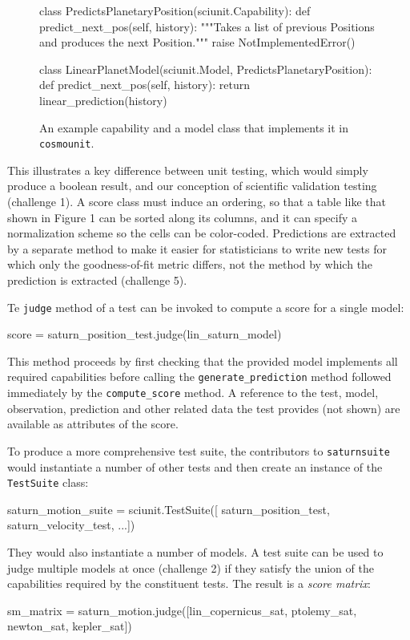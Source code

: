 \documentclass[9pt]{sig-alternate}
\newcommand{\verbx}[1]{\lstinline{#1}}
\begin{document}
\begin{figure}
\small
\begin{python}
class PredictsPlanetaryPosition(sciunit.Capability):
  def predict_next_pos(self, history): 
    """Takes a list of previous Positions and produces the next Position."""
    raise NotImplementedError()

class LinearPlanetModel(sciunit.Model, 
    PredictsPlanetaryPosition):
  def predict_next_pos(self, history):
    return linear_prediction(history)
\end{python}
\vspace{-12px}
\caption{\small An example capability and a model class that implements it in \verbx{cosmounit}.}
\label{fig:capability}
\vspace{-10px}
\end{figure}

This illustrates a key difference between unit testing, which would simply produce a boolean result, and our conception of scientific validation testing (challenge 1). A score class must induce an ordering, so that a table like that shown in Figure 1 can be sorted along its columns, and it can  specify a normalization scheme so the cells can be color-coded. Predictions are extracted by a separate method to make it easier for statisticians to write new tests for which only the goodness-of-fit metric differs, not the method by which the prediction is extracted (challenge 5). %

Te \verbx{judge} method of a test can be invoked to compute a score for a single model: 
\vspace{-4px}
\begin{python}
score = saturn_position_test.judge(lin_saturn_model)
\end{python}
\vspace{-5px}
This method proceeds by first checking that the provided model implements all required capabilities before calling the \verbx{generate_prediction} method followed immediately by the \verbx{compute_score} method. A reference to the test,   model, observation, prediction and other related data the test provides (not shown) are available as attributes of the score.

To produce a more comprehensive test suite, the contributors to \verbx{saturnsuite} would instantiate a number of other tests and then create an instance of the \verbx{TestSuite} class:
\begin{python}
saturn_motion_suite = sciunit.TestSuite([
  saturn_position_test, saturn_velocity_test, ...])
\end{python}
They would also instantiate a number of models. A test suite can be used to judge multiple models at once (challenge 2) if they satisfy the union of the capabilities required by the constituent tests. The result is a \emph{score matrix}:
\begin{python}
sm_matrix = saturn_motion.judge([lin_copernicus_sat, ptolemy_sat, newton_sat, kepler_sat])
\end{python}
\end{document}
